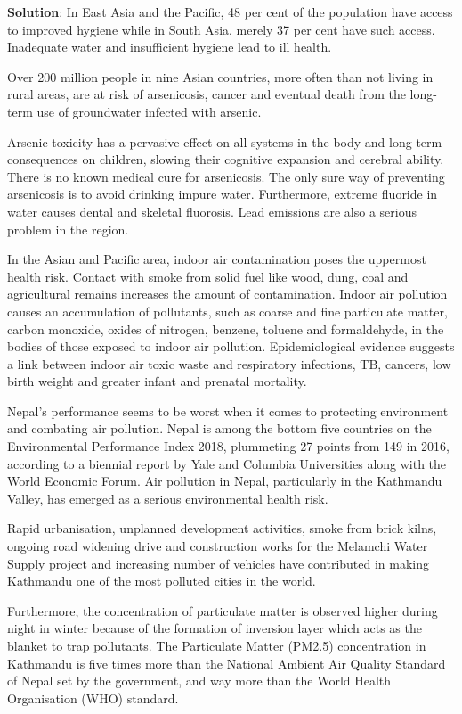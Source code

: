 \documentclass[
]{book}
\newenvironment{solution}{ {\bfseries Solution}:}{}
\begin{document}
\begin{questions}
\begin{solution}
In East Asia and the Pacific, 48 per cent of the population have access to improved hygiene while in South Asia, merely 37 per cent have such access. Inadequate water and insufficient hygiene lead to ill health.

Over 200 million people in nine Asian countries, more often than not living in rural areas, are at risk of arsenicosis, cancer and eventual death from the long-term use of groundwater infected with arsenic.

Arsenic toxicity has a pervasive effect on all systems in the body and long-term consequences on children, slowing their cognitive expansion and cerebral ability. There is no known medical cure for arsenicosis. The only sure way of preventing arsenicosis is to avoid drinking impure water. Furthermore, extreme fluoride in water causes dental and skeletal fluorosis. Lead emissions are also a serious problem in the region.

In the Asian and Pacific area, indoor air contamination poses the uppermost health risk. Contact with smoke from solid fuel like wood, dung, coal and agricultural remains increases the amount of contamination. Indoor air pollution causes an accumulation of pollutants, such as coarse and fine particulate matter, carbon monoxide, oxides of nitrogen, benzene, toluene and formaldehyde, in the bodies of those exposed to indoor air pollution. Epidemiological evidence suggests a link between indoor air toxic waste and respiratory infections, TB, cancers, low birth weight and greater infant and prenatal mortality. 

Nepal's performance seems to be worst when it comes to protecting environment and combating air pollution. Nepal is among the bottom five countries on the Environmental Performance Index 2018, plummeting 27 points from 149 in 2016, according to a biennial report by Yale and Columbia Universities along with the World Economic Forum. Air pollution in Nepal, particularly in the Kathmandu Valley, has emerged as a serious environmental health risk.

Rapid urbanisation, unplanned development activities, smoke from brick kilns, ongoing road widening drive and construction works for the Melamchi Water Supply project and increasing number of vehicles have contributed in making Kathmandu one of the most polluted cities in the world.

Furthermore, the concentration of particulate matter is observed higher during night in winter because of the formation of inversion layer which acts as the blanket to trap pollutants. The Particulate Matter (PM2.5) concentration in Kathmandu is five times more than the National Ambient Air Quality Standard of Nepal set by the government, and way more than the World Health Organisation (WHO) standard.


\end{solution}
\end{questions}
\end{document}
